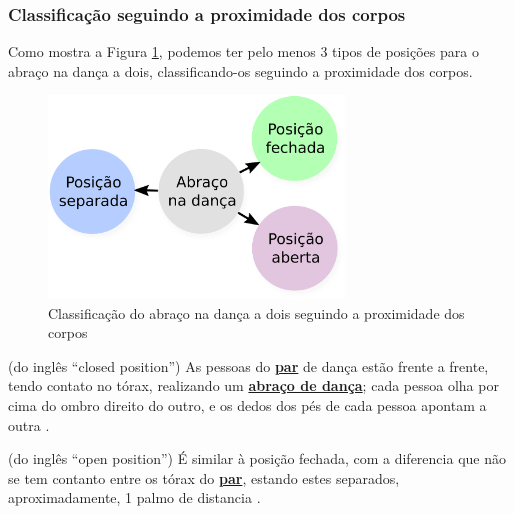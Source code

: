 \subsubsection{Classificação seguindo a proximidade dos corpos}

Como mostra a Figura \ref{fig:proximidadeabraco1},
podemos ter pelo menos 3 tipos de posições
para o abraço na dança a dois, 
classificando-os seguindo a proximidade dos corpos.

\begin{figure}[!ht]
     \centering
\includegraphics[width=0.7\textwidth]{chapters/cap-normas/proximidadeabraco1.eps}
\caption{Classificação do abraço na dança a dois seguindo a proximidade dos corpos}
\label{fig:proximidadeabraco1}
\end{figure}

\begin{definition}
\label{def:closed-position}  (do inglês ``closed position'')
As pessoas do \hyperref[def:Par]{\textbf{par}} de dança estão frente a frente, tendo contato no tórax,
realizando um \hyperref[def:abracodedanca]{\textbf{abraço de dança}}; 
cada pessoa olha por cima do ombro direito do outro,
e os dedos dos pés de cada pessoa apontam a outra \cite{fletsher2015improve}.
\end{definition}


\begin{definition}
\label{def:open-position} (do inglês ``open position'') 
É similar à posição fechada, 
com a diferencia que não se tem contanto entre os tórax do \hyperref[def:Par]{\textbf{par}},
estando estes separados, aproximadamente, 1 palmo de distancia \cite{fletsher2015improve}.
\end{definition}



